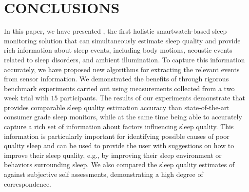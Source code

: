 \section{CONCLUSIONS}
In this paper, we have presented {\systemname}, the first holistic smartwatch-based sleep monitoring solution that can simultaneously estimate sleep quality and provide rich information about sleep events, including body motions, acoustic events related to sleep disorders, and ambient illumination. To capture this information accurately, we have proposed new algorithms for extracting the relevant events from sensor information. We demonstrated the benefits of {\systemname} through rigorous benchmark experiments carried out using measurements collected from a two week trial with $15$ participants. The results of our experiments demonstrate that {\systemname} provides comparable sleep quality estimation accuracy than state-of-the-art consumer grade sleep monitors, while at the same time being able to accurately capture a rich set of information about factors influencing sleep quality. This information is particularly important for identifying possible causes of poor quality sleep and can be used to provide the user with suggestions on how to improve their sleep quality, e.g., by improving their sleep environment or behaviors surrounding sleep. We also compared the sleep quality estimates of {\systemname} against subjective self assessments, demonstrating a high degree of correspondence.
